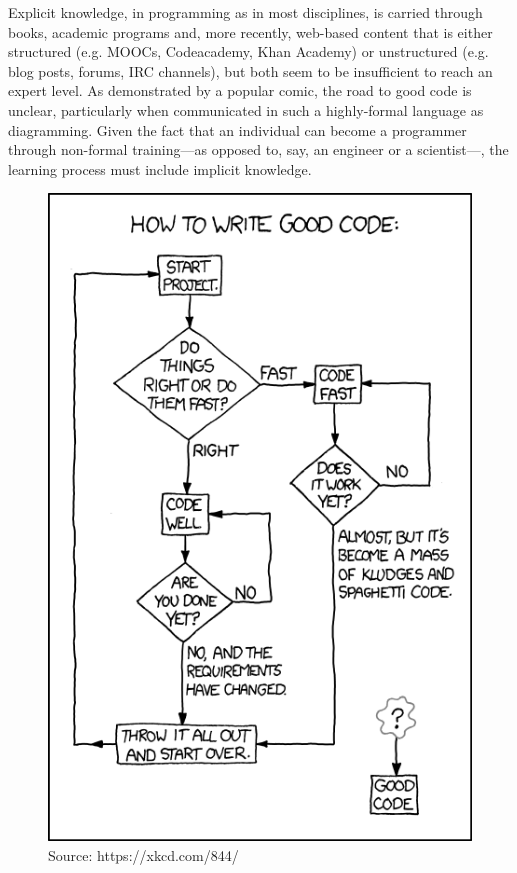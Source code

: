 \documentclass{article}
\begin{document}
Explicit knowledge, in programming as in most disciplines, is carried through books, academic programs and, more recently, web-based content that is either structured (e.g. MOOCs, Codeacademy, Khan Academy) or unstructured (e.g. blog posts, forums, IRC channels), but both seem to be insufficient to reach an expert level\cite{davies_models_1993}. As demonstrated by a popular comic, the road to good code is unclear, particularly when communicated in such a highly-formal language as diagramming. Given the fact that an individual can become a programmer through non-formal training---as opposed to, say, an engineer or a scientist---, the learning process must include implicit knowledge.

\begin{figure}
    \centering
    \includegraphics[scale=0.5]{good_code.png}
    \caption{Source: https://xkcd.com/844/}
\end{figure}
\end{document}
